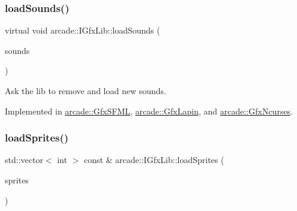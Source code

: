 \mbox{\label{classarcade_1_1_i_gfx_lib_a725faf0722d284d15eb389b0a1891a27}} 
\subsubsection{\texorpdfstring{load\+Sounds()}{loadSounds()}}
{\footnotesize\ttfamily virtual void arcade\+::\+I\+Gfx\+Lib\+::load\+Sounds (\begin{DoxyParamCaption}\item[{std\+::vector$<$ std\+::pair$<$ std\+::string, \hyperlink{namespacearcade_a3bb4743a2eea59f3927e404e6549cae5}{Sound\+Type} $>$ $>$ const \&}]{sounds }\end{DoxyParamCaption})\hspace{0.3cm}{\ttfamily [pure virtual]}}



Ask the lib to remove and load new sounds. 



Implemented in \hyperlink{classarcade_1_1_gfx_s_f_m_l_aaec16dc42e480cdb6b6cbc3f75e4951c}{arcade\+::\+Gfx\+S\+F\+ML}, \hyperlink{classarcade_1_1_gfx_lapin_a54039353c2da52bb45b233d4b8839551}{arcade\+::\+Gfx\+Lapin}, and \hyperlink{classarcade_1_1_gfx_ncurses_a450bb0bdb3a31f8733cc71cb39ddfb16}{arcade\+::\+Gfx\+Ncurses}.

\mbox{\label{classarcade_1_1_i_gfx_lib_ad5b301c8ff56c428971a2a006514b709}} 
\subsubsection{\texorpdfstring{load\+Sprites()}{loadSprites()}}
{\footnotesize\ttfamily std\+::vector$<$ int $>$ const  \& arcade\+::\+I\+Gfx\+Lib\+::load\+Sprites (\begin{DoxyParamCaption}\item[{std\+::vector$<$ std\+::unique\+\_\+ptr$<$ \hyperlink{classarcade_1_1_i_sprite}{I\+Sprite} $>$$>$ \&\&}]{sprites }\end{DoxyParamCaption})\hspace{0.3cm}{\ttfamily [pure virtual]}}



